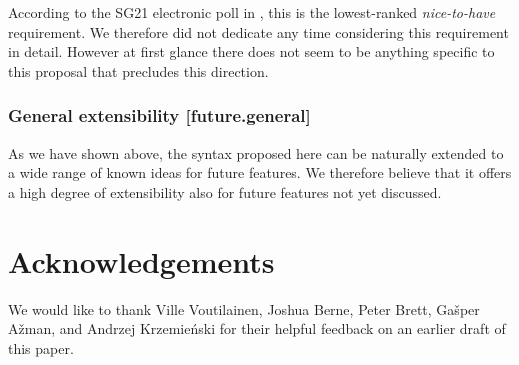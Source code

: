 According to the SG21 electronic poll in \cite{P2885R2}, this is the lowest-ranked \emph{nice-to-have} requirement. We therefore did not dedicate any time considering this requirement in detail. However at first glance there does not seem to be anything specific to this proposal that precludes this direction.

\subsubsection{General extensibility  [future.general]}

As we have shown above, the syntax proposed here can be naturally extended to a wide range of known ideas for future features. We therefore believe that it offers a high degree of extensibility also for future features not yet discussed.

\label{subsec:future}



\section*{Acknowledgements}

We would like to thank Ville Voutilainen, Joshua Berne, Peter Brett, Ga\v sper A\v zman, and Andrzej Krzemie\' nski for their helpful feedback on an earlier draft of this paper.

\renewcommand{\bibname}{References}




